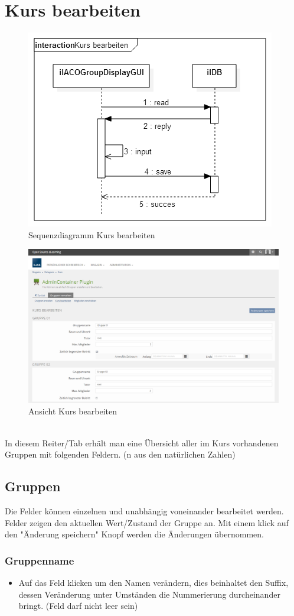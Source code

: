 \section{Kurs bearbeiten}
\begin{figure}[h!]
	\centering
	\includegraphics[width=.45\textwidth]{img/seq_groupdisplayGUI.png}
	\caption{Sequenzdiagramm Kurs bearbeiten}
\end{figure}
\begin{figure}[h!]
	\centering
	\includegraphics[width=.95\textwidth]{img/kursBearbeiten.png}
	\caption{Ansicht Kurs bearbeiten}
\end{figure}


~\\In diesem Reiter/Tab erhält man eine Übersicht aller im Kurs vorhandenen Gruppen mit folgenden Feldern. (n aus den natürlichen Zahlen)
\newpage
\subsection*{Gruppen}
Die Felder können einzelnen und unabhängig voneinander bearbeitet werden. Felder zeigen den aktuellen Wert/Zustand der Gruppe an. 
Mit einem klick auf den "Änderung speichern" Knopf werden die Änderungen übernommen. 

\subsubsection{Gruppenname}
\begin{itemize}
	\item Auf das Feld klicken um den Namen verändern, dies beinhaltet den Suffix, dessen Veränderung unter Umständen die Nummerierung durcheinander bringt. (Feld darf nicht leer sein)
\end{itemize}

